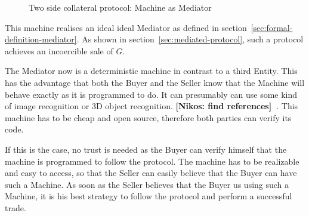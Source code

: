 \documentclass{cacthesis}
\newcommand{\authnote}[3]{{ \footnotesize \textbf{#1[#2: #3]~}}}
\newcommand{\orfnote}[1]{\authnote{\color{blue}}{Orfeas}{#1}}
\newcommand{\niknote}[1]{\authnote{\color{red}}{Nikos}{#1}}
\begin{document}
\begin{figure}[htb!]
    \centering
    \caption{Two side collateral protocol: Machine as Mediator}
    \label{pro:two-side-collateral-machine}
\end{figure}

This machine realises an ideal ideal Mediator as defined in section~\ref{sec:formal-definition-mediator}. As shown in section~\ref{sec:mediated-protocol}, such a protocol achieves an incoercible sale of $G$.\newline

The Mediator now is a deterministic machine in contrast to a third Entity. This has the advantage that both the Buyer and the Seller know that the Machine will behave exactly as it is programmed to do. It can presumably can use some kind of image recognition or 3D object recognition. \niknote{find references}. This machine has to be cheap
and open source, therefore both parties can verify its code.\newline 

If this is the case, no trust is needed as the Buyer can verify himself that the machine is programmed to follow the protocol. The machine has to be realizable and easy to access, so that the Seller can
easily believe that the Buyer can have such a Machine. As soon as the Seller believes that the Buyer us using such a Machine, it is his best strategy to follow the protocol and perform a successful trade.

\end{document}

